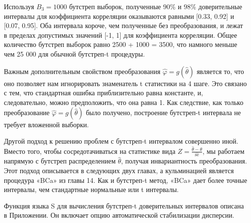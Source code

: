 \begin{figure}[H]
\end{figure}


Используя $ B_{3} = 1000$ бутстреп выборок, полученные $90\%$ и $98\%$ доверительные интервалы для коэффициента корреляции оказываются равными [0.33, 0.92] и [0.07, 0.95]. Оба интервала короче, чем полученные без преобразования, и лежат в пределах допустимых значений [-1, 1] для коэффициента корреляции. Общее количество бутстреп выборок равно 2500 + 1000 = 3500, что намного меньше чем 25 000 для обычной бутстреп-t процедуры.

Важным дополнительным свойством преобразования $\widehat{\varphi} = g (\widehat{\theta})$ является то, что оно позволяет нам игнорировать знаменатель t статистики  на 4 шаге. Это связано с тем, что стандартная ошибка приблизительно равна константе, и, следовательно, можно предположить, что она равна 1. Как следствие, как только преобразование $\widehat{\varphi} = g (\widehat{\theta})$ было получено, построение бутстреп-t интервала не требует вложенной выборки.

Другой подход к решению проблем с бутстреп-t интервалом совершенно иной. Вместо того, чтобы сосредотачиваться на статистике вида $Z = \frac{\widehat{\theta} - \theta}{\widehat{\text{se}}}$, мы работаем напрямую с бутстреп распределением $\widehat{\theta}$, получая инвариантность преобразования.
Этот подход описывается в следующих двух главах, а кульминацией является процедура «BCa» из главы 14. Как и бутстреп-t метод, «BCa» дает более точные интервалы, чем стандартные нормальные или t интервалы.

Функция языка S для вычисления бутстреп-t доверительных интервалов описана в Приложении. Он включает опцию автоматической стабилизации дисперсии.
